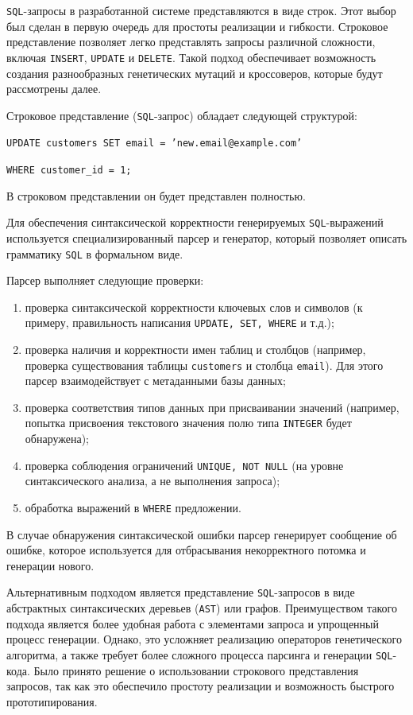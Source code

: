 \documentclass[master,paper]{pmk-graduate}
\begin{document}
\texttt{SQL}-запросы в разработанной системе представляются в виде строк. Этот выбор был сделан в первую очередь для простоты реализации и гибкости. Строковое представление позволяет легко представлять запросы различной сложности, включая \texttt{INSERT}, \texttt{UPDATE} и \texttt{DELETE}. Такой подход обеспечивает возможность создания разнообразных генетических мутаций и кроссоверов, которые будут рассмотрены далее.

Строковое представление (\texttt{SQL}-запрос) обладает следующей структурой:

\texttt{UPDATE customers SET email = 'new.email@example.com'}

\texttt{WHERE customer\_id = 1;}

В строковом представлении он будет представлен полностью.

Для обеспечения синтаксической корректности генерируемых \texttt{SQL}-выраже\-ний используется специализированный парсер и генератор, который позво\-ляет описать грамматику \texttt{SQL} в формальном виде.

Парсер выполняет следующие проверки:
\begin{enumerate}
\item проверка синтаксической корректности ключевых слов и символов (к примеру, правильность написания \texttt{UPDATE, SET, WHERE} и т.д.);
\item проверка наличия и корректности имен таблиц и столбцов (например, проверка существования таблицы \texttt{customers} и столбца \texttt{email}). Для этого парсер взаимодействует с метаданными базы данных;
\item проверка соответствия типов данных при присваивании значений (например, попытка присвоения текстового значения полю типа \texttt{INTEGER} будет обнаружена);
\item проверка соблюдения ограничений \texttt{UNIQUE, NOT NULL} (на уровне синтаксического анализа, а не выполнения запроса);
\item обработка выражений в \texttt{WHERE} предложении.
\end{enumerate}
В случае обнаружения синтаксической ошибки парсер генерирует сообщение об ошибке, которое используется для отбрасывания некорректного потомка и генерации нового.

Альтернативным подходом является представление \texttt{SQL}-запросов в виде абстрактных синтаксических деревьев (\texttt{AST}) или графов. Преимуществом такого подхода является более удобная работа с элементами запроса и упрощенный процесс генерации. Однако, это усложняет реализацию операторов генетического алгоритма, а также требует более сложного процесса парсинга и генерации \texttt{SQL}-кода. Было принято решение о использовании строкового представления запросов, так как это обеспечило простоту реализации и возможность быстрого прототипирования.
\end{document}
